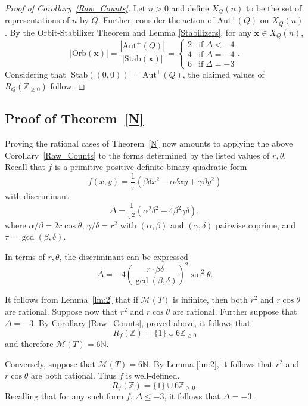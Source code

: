 \documentclass[11pt]{amsart}
\theoremstyle{definition}
\begin{document}
\begin{proof}[Proof of Corollary~\ref{Raw_Counts}]
    Let $n>0$ and define $X_Q(n)$ to be the set of representations of $n$ by $Q$. Further, consider the action of $\text{Aut}^+(Q)$ on $X_Q(n)$. By the Orbit-Stabilizer Theorem and Lemma \ref{Stabilizers}, for any $\mathbf{x}\in X_Q(n)$, 
    \[|\text{Orb}(\mathbf{x})|=\dfrac{|\text{Aut}^+(Q)|}{|\text{Stab}(\mathbf{x})|}=\begin{cases}
        2&\text{if}\;\Delta<-4\\
        4&\text{if}\;\Delta=-4\\
        6&\text{if}\;\Delta=-3
    \end{cases}.\]
    Considering that $|\text{Stab}((0,0))|=\text{Aut}^+(Q)$, the claimed values of $R_Q(\mathbb{Z}_{\geq 0})$ follow.
\end{proof}


\subsection{Proof of Theorem~\ref{N}}

Proving the rational cases of Theorem~\ref{N} now amounts to applying the above Corollary~\ref{Raw_Counts} to the forms determined by the listed values of $r,\theta$.    Recall that $f$ is a primitive positive-definite binary quadratic form
    \[
    f(x,y)=\frac{1}{\tau}(\beta\delta x^2 - \alpha\delta xy + \gamma\beta y^2)
    \]
    with discriminant \[\Delta = \frac{1}{\tau^2}\left(\alpha^2\delta^2-4\beta^2\gamma\delta\right),\] where $\alpha/\beta=2r\cos\theta$, $\gamma/\delta=r^2$ with $(\alpha,\beta)$ and $(\gamma,\delta)$  pairwise coprime, and $\tau=\gcd(\beta, \delta)$.

    In terms of $r,\theta$, the discriminant can be expressed 
    \[
    \Delta = -4\left(\dfrac{r\cdot\beta\delta}{\gcd(\beta,\delta)}\right)^2 \sin^2\theta.
    \]

    It follows from Lemma~\ref{lm:2} that if $\mathcal{M}(T)$ is infinite, then both $r^2$ and $r\cos\theta$ are rational. 
    Suppose now that $r^2$ and $r\cos\theta$ are rational. Further suppose that $\Delta = -3$. By Corollary \ref{Raw_Counts}, proved above, it follows that 
    \[
    R_f(\mathbb{Z})=\{1\}\cup 6\mathbb{Z}_{\geq 0}
    \] and therefore $\mathcal{M}(T)=6\mathbb{N}.$

    Conversely, suppose that $\mathcal{M}(T)=6\mathbb{N}$. By Lemma \ref{lm:2}, it follows that $r^2$ and $r\cos\theta$ are both rational. Thus $f$ is well-defined. 
    \[
    R_f(\mathbb{Z})=\{1\}\cup 6\mathbb{Z}_{\geq 0}.
    \]
    Recalling that for any such form $f$, $\Delta\leq -3$, it follows that $ \Delta = -3.$
\end{document}
